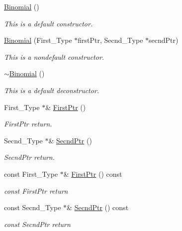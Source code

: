 \begin{DoxyCompactItemize}
\item 
\hyperlink{class_binomial_af09d420e38603496bf3bef29332e5828}{Binomial} ()
\begin{DoxyCompactList}\small\item\em This is a default constructor. \end{DoxyCompactList}\item 
\hyperlink{class_binomial_a124e073e89f235b8b62ffbe0c0b65472}{Binomial} (First\+\_\+\+Type $\ast$first\+Ptr, Secnd\+\_\+\+Type $\ast$secnd\+Ptr)
\begin{DoxyCompactList}\small\item\em This is a nondefault constructor. \end{DoxyCompactList}\item 
\hyperlink{class_binomial_abe3263cfb456f2b3b2e0e3486f7cd45c}{$\sim$\+Binomial} ()
\begin{DoxyCompactList}\small\item\em This is a default deconstructor. \end{DoxyCompactList}\item 
First\+\_\+\+Type $\ast$\& \hyperlink{class_binomial_a21c033051a572ed5339f37f085c7ffc9}{First\+Ptr} ()
\begin{DoxyCompactList}\small\item\em First\+Ptr return. \end{DoxyCompactList}\item 
Secnd\+\_\+\+Type $\ast$\& \hyperlink{class_binomial_a5cbb90adb595570afa8a4ffe5fadad3a}{Secnd\+Ptr} ()
\begin{DoxyCompactList}\small\item\em Secnd\+Ptr return. \end{DoxyCompactList}\item 
const First\+\_\+\+Type $\ast$\& \hyperlink{class_binomial_a0efc152a49648b63b5b52a4170535336}{First\+Ptr} () const 
\begin{DoxyCompactList}\small\item\em const First\+Ptr return \end{DoxyCompactList}\item 
const Secnd\+\_\+\+Type $\ast$\& \hyperlink{class_binomial_a4c52d21a8a0395fb486907b2ab35999b}{Secnd\+Ptr} () const 
\begin{DoxyCompactList}\small\item\em const Secnd\+Ptr return \end{DoxyCompactList}\end{DoxyCompactItemize}


